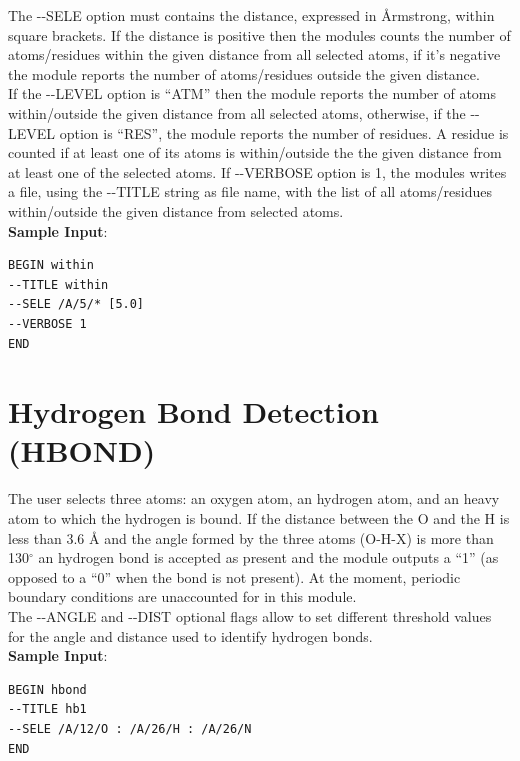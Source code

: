 \documentclass[11pt,twoside,onecolumn,a4paper,openright,notitlepage]{book}[2001/04/21]
\begin{document}
The -{}-SELE option must contains the distance, expressed in \r{A}rmstrong, within square brackets. If the distance is positive then the modules
counts the number of atoms/residues within the given distance from all selected atoms, if it's negative the module reports the number of atoms/residues
outside the given distance.\\
If the -{}-LEVEL option is ``ATM'' then the module reports the number of atoms within/outside the given distance from all
selected atoms, otherwise, if the -{}-LEVEL option is ``RES'', the module reports the number of residues. A residue is counted if at least one of its
atoms is within/outside the the given distance from at least one of the selected atoms.
If -{}-VERBOSE option is 1, the modules writes a file, using the -{}-TITLE string as file name, with the list of all atoms/residues
within/outside the given distance from selected atoms.\\

\textbf{\large Sample Input}:
\begin{verbatim}
BEGIN within
--TITLE within
--SELE /A/5/* [5.0]
--VERBOSE 1
END
\end{verbatim}
\clearpage{}

\section{Hydrogen Bond Detection (HBOND)}
The user selects three atoms: an oxygen atom, an hydrogen atom, and an heavy atom to which the hydrogen is bound. If the distance between the O and the H is less than 3.6 \AA{} and the angle formed by the three atoms (O-H-X) is more than 130$^\circ$ an hydrogen bond is accepted as present and the module outputs a ``1'' (as opposed to a ``0'' when the bond is not present). At the moment, periodic boundary conditions are unaccounted for in this module.\\ 
The -{}-ANGLE and -{}-DIST optional flags allow to set different threshold values for the angle and distance used to identify hydrogen bonds.\\

\textbf{\large Sample Input}:
\begin{verbatim}
BEGIN hbond
--TITLE hb1
--SELE /A/12/O : /A/26/H : /A/26/N
END
\end{verbatim}
\clearpage{}
\end{document}
